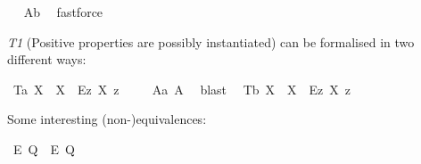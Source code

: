 \begin{isabellebody}
\isadelimproof
\ %
\endisadelimproof
%
\isatagproof
{}\isamarkupfalse%
\ A{}b\ \isamarkupfalse%
\ fastforce%
\endisatagproof
{\isafoldproof}%
%
\isadelimproof
%
\endisadelimproof
%
\begin{isamarkuptext}%
\emph{T1} (Positive properties are possibly instantiated) can be formalised in two different ways:%
\end{isamarkuptext}\isamarkuptrue%
\isamarkupfalse%
\ T{}a{\isacharcolon}\ {\isachardoublequoteopen}{\isasymlfloor}\isactrlbold {\isasymforall}X{\isacharcolon}{\isacharcolon}{\isasymlangle}{\isasymzero}{\isasymrangle}{\isachardot}\ {\isasymP}\ X\ \isactrlbold {\isasymrightarrow}\ \isactrlbold {\isasymdiamond}{\isacharparenleft}\isactrlbold {\isasymexists}\isactrlsup Ez{\isachardot}\ {\isasymlparr}X\ z{\isasymrparr}{\isacharparenright}{\isasymrfloor}{\isachardoublequoteclose}\ \isanewline
%
\isadelimproof
\ \ %
\endisadelimproof
%
\isatagproof
{}\isamarkupfalse%
\ A{}a\ A{}\ \isamarkupfalse%
\ blast\ %
%
\endisatagproof
{\isafoldproof}%
%
\isadelimproof
\isanewline
%
\endisadelimproof
{}\isamarkupfalse%
\ T{}b{\isacharcolon}\ {\isachardoublequoteopen}{\isasymlfloor}\isactrlbold {\isasymforall}X{\isacharcolon}{\isacharcolon}{\isasymup}{\isasymlangle}{\isasymzero}{\isasymrangle}{\isachardot}\ {\isasymP}\ {\isasymdown}X\ \isactrlbold {\isasymrightarrow}\ \isactrlbold {\isasymdiamond}{\isacharparenleft}\isactrlbold {\isasymexists}\isactrlsup Ez{\isachardot}\ X\ z{\isacharparenright}{\isasymrfloor}{\isachardoublequoteclose}\ \isanewline
\ \ \isamarkupfalse%
%
\isadelimproof
\ %
\endisadelimproof
%
\isatagproof
{}\isamarkupfalse%
\ %
%
\endisatagproof
{\isafoldproof}%
%
\isadelimproof
%
\endisadelimproof
%
\begin{isamarkuptext}%
Some interesting (non-)equivalences:%
\end{isamarkuptext}\isamarkuptrue%
\isamarkupfalse%
\ {\isachardoublequoteopen}{\isasymlfloor}\isactrlbold {\isasymbox}\isactrlbold {\isasymexists}\isactrlsup E\ {\isacharparenleft}Q{\isacharcolon}{\isacharcolon}{\isasymup}{\isasymlangle}{\isasymzero}{\isasymrangle}{\isacharparenright}\ \isactrlbold {\isasymleftrightarrow}\ \isactrlbold {\isasymbox}{\isacharparenleft}\isactrlbold {\isasymexists}\isactrlsup E\ \isactrlbold {\isasymdown}Q{\isacharparenright}{\isasymrfloor}{\isachardoublequoteclose}%

\end{isabellebody}
